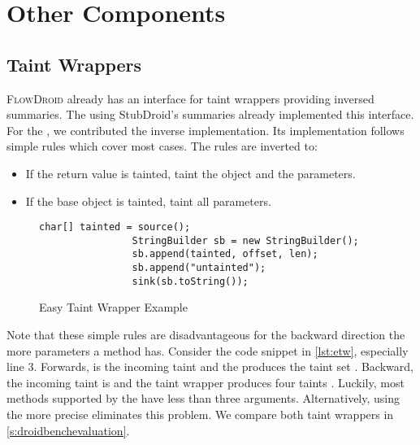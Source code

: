 \documentclass[../draft.tex]{subfiles}
\begin{document}

    \section{Other Components}
    \subsection{Taint Wrappers}\label{s:taintwrapper}
    \textsc{FlowDroid} already has an interface  for taint wrappers providing inversed summaries.
    The  using StubDroid's summaries already implemented this interface.
    For the , we contributed the inverse implementation.
    Its implementation follows simple rules which cover most cases\cite{Arzt2017PhD}.
    The rules are inverted to:
    \begin{itemize}
        \item If the return value is tainted, taint the object and the parameters.
        \item If the base object is tainted, taint all parameters.
    \end{itemize}

    \begin{figure}[tbp]
        \centering
        \begin{adjustbox}{max width=\columnwidth}
            \begin{lstlisting}[gobble=16]
                char[] tainted = source();
                StringBuilder sb = new StringBuilder();
                sb.append(tainted, offset, len);
                sb.append("untainted");
                sink(sb.toString());
            \end{lstlisting}
        \end{adjustbox}
        \caption{Easy Taint Wrapper Example}
        \label{lst:etw}
    \end{figure}

    Note that these simple rules are disadvantageous for the backward direction the more parameters a method has.
    Consider the code snippet in \autoref{lst:etw}, especially line 3.
    Forwards,  is the incoming taint and the  produces the taint set .
    Backward, the incoming taint is  and the taint wrapper produces four taints .
    Luckily, most methods supported by the  have less than three arguments.
    Alternatively, using the more precise  eliminates this problem. 
    We compare both taint wrappers in \autoref{s:droidbenchevaluation}.
\end{document}
